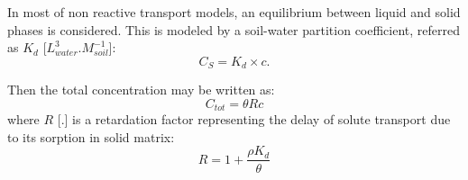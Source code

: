 In most of non reactive transport models, an equilibrium between liquid and
solid phases is considered. This is modeled by a soil-water partition
coefficient, referred as $K_d$ [$L^3_{water}.M^{-1}_{soil}$]:
\begin{equation}
  \label{eq:groundwater:Kd}
  C_S = K_d \times c.
\end{equation}

Then the total concentration may be written as:
\begin{equation}
  C_{tot} = \theta R c
\end{equation}
where $R$ [.] is a retardation factor representing the delay of solute transport
due to its sorption in solid matrix:
\begin{equation}
  R = 1 + \frac{\rho K_d}{\theta}
\end{equation}


